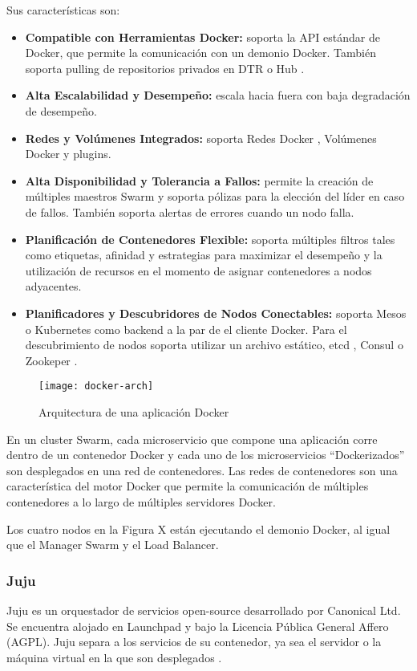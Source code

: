 Sus características son:
\begin{itemize}
\item \textbf{Compatible con Herramientas Docker: } soporta la API estándar de Docker, que permite la comunicación con un demonio Docker. También soporta pulling de repositorios privados en DTR  \cite{Docker2016-is} o Hub \cite{Docker2016-ev}.
\item \textbf{Alta Escalabilidad y Desempeño: }escala hacia fuera con baja degradación de desempeño. 
\item \textbf{Redes y Volúmenes Integrados: }soporta Redes Docker \cite{Docker2016-dm}, Volúmenes Docker \cite{Docker2016-mi} y plugins.
\item \textbf{Alta Disponibilidad y Tolerancia a Fallos: }permite la creación de múltiples maestros Swarm y soporta pólizas para la elección del líder en caso de fallos. También soporta alertas de errores cuando un nodo falla.
\item \textbf{Planificación de Contenedores Flexible: }soporta múltiples filtros tales como etiquetas, afinidad y estrategias para maximizar el desempeño y la utilización de recursos en el momento de asignar contenedores a nodos adyacentes.
\item \textbf{Planificadores y Descubridores de Nodos Conectables: }soporta Mesos o Kubernetes como backend a la par de el cliente Docker. Para el descubrimiento de nodos soporta utilizar un archivo estático, etcd \cite{Coreos2016-ep}, Consul \cite{HashiCorp2016-ei} o Zookeper \cite{Apache2016-oo}.

\end{itemize}

\begin{figure}[H]
    \centering
    \texttt{[image: docker-arch]}
    \caption{ Arquitectura de una aplicación Docker \protect\cite{Docker2016-pk}}
    \label{fig:docker-arch}
\end{figure}
En un cluster Swarm, cada microservicio que compone una aplicación corre dentro de un contenedor Docker y cada uno de los microservicios “Dockerizados” son desplegados en una red de contenedores. Las redes de contenedores son una característica del motor Docker que permite la comunicación de múltiples contenedores a lo largo de múltiples servidores Docker. 

Los cuatro nodos en la Figura X están ejecutando el demonio Docker, al igual que el Manager Swarm y el Load Balancer.


\subsubsection{Juju}
Juju es un orquestador de servicios open-source desarrollado por Canonical Ltd. Se encuentra alojado en Launchpad y bajo la Licencia Pública General Affero (AGPL). Juju separa a los servicios de su contenedor, ya sea el servidor o la máquina virtual en la que son desplegados \cite{Canonical2016-qx}. 

